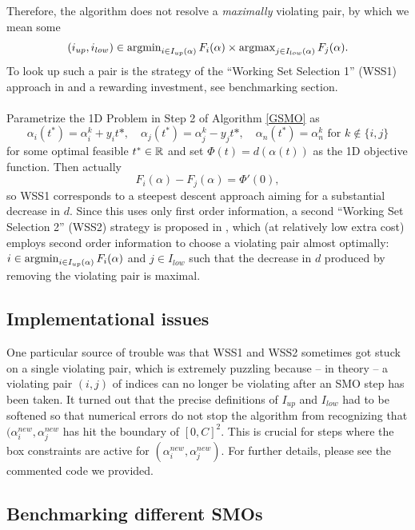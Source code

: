 Therefore, the algorithm does not resolve a \textit{maximally} violating pair, by which we mean some 
\[
(i_{up},i_{low}) \in \operatorname{argmin}_{i \in I_{up}(\alpha)}F_i(\alpha) \times \operatorname{argmax}_{j \in I_{low}(\alpha)}F_j(\alpha).
\] To look up such a pair is the strategy of the ``Working Set Selection 1'' (WSS1) approach in \cite{FanChenLin} and a rewarding investment, see benchmarking section. \\\\
Parametrize the 1D Problem in Step 2 of Algorithm \ref{GSMO} as
\[
\alpha_i(t^*) = \alpha^k_i + y_i t*, \quad \alpha_j(t^*) = \alpha^k_j - y_j t*, \quad \alpha_n(t^*) = \alpha^k_n \text{ for } k \notin \{i,j\}
\]
for some optimal feasible $t^* \in \mathbb{R}$ and set $\Phi(t) = d(\alpha(t))$ as the 1D objective function. Then actually
\begin{equation*}
F_i(\alpha) - F_j(\alpha) = \Phi'(0),
\end{equation*}
so WSS1 corresponds to a steepest descent approach aiming for a substantial decrease in $d$. Since this uses only first order information, a second ``Working Set Selection 2'' (WSS2) strategy is proposed in \cite{FanChenLin}, which (at relatively low extra cost) employs second order information to choose a violating pair almost optimally: $i \in \operatorname{argmin}_{i \in I_{up}(\alpha)}F_i(\alpha)$ and $j \in I_{low}$ such that the decrease in $d$ produced by removing the violating pair is maximal.

\subsection{Implementational issues}
One particular source of trouble was that WSS1 and WSS2 sometimes got stuck on a single violating pair, which is extremely puzzling because -- in theory -- a violating pair $(i,j)$ of indices can no longer be violating after an SMO step has been taken. It turned out that the precise definitions of $I_{up}$ and $I_{low}$ had to be softened so that numerical errors do not stop the algorithm from recognizing that $(\alpha^{new}_i,\alpha^{new}_j$ has hit the boundary of $[0,C]^2$. This is crucial for steps where the box constraints are active for $(\alpha^{new}_i,\alpha^{new}_j)$. For further details, please see the commented code we provided. 

\subsection{Benchmarking different SMOs}

